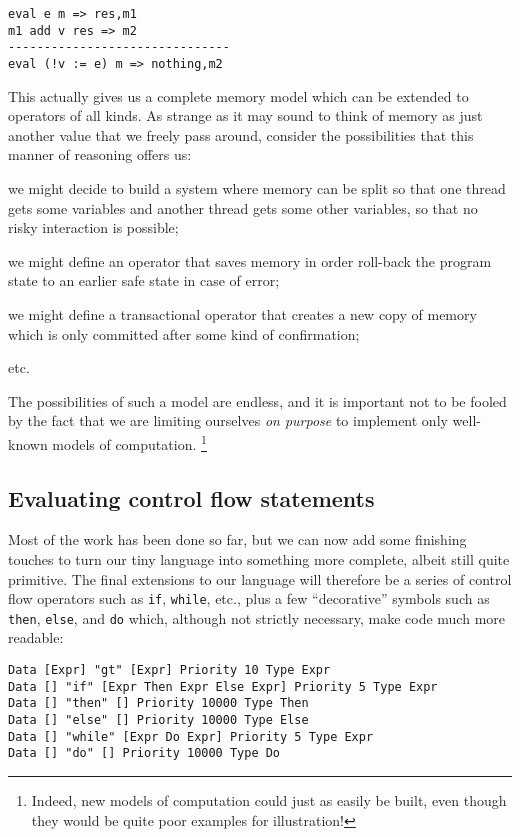 \begin{lstlisting}
eval e m => res,m1
m1 add v res => m2
-------------------------------
eval (!v := e) m => nothing,m2
\end{lstlisting}

This actually gives us a complete memory model which can be extended to operators of all kinds. As strange as it may sound to think of memory as just another value that we freely pass around, consider the possibilities that this manner of reasoning offers us:
\begin{inparaenum}
\item we might decide to build a system where memory can be split so that one thread gets some variables and another thread gets some other variables, so that no risky interaction is possible;
\item we might define an operator that saves memory in order roll-back the program state to an earlier safe state in case of error;
\item we might define a transactional operator that creates a new copy of memory which is only committed after some kind of confirmation;
\item etc.
\end{inparaenum}

The possibilities of such a model are endless, and it is important not to be fooled by the fact that we are limiting ourselves \textit{on purpose} to implement only well-known models of computation. \footnote{Indeed, new models of computation could just as easily be built, even though they would be quite poor examples for illustration!}

\subsection{Evaluating control flow statements}

Most of the work has been done so far, but we can now add some finishing touches to turn our tiny language into something more complete, albeit still quite primitive. The final extensions to our language will therefore be a series of control flow operators such as \texttt{if}, \texttt{while}, etc., plus a few ``decorative'' symbols such as \texttt{then}, \texttt{else}, and \texttt{do} which, although not strictly necessary, make code much more readable:

\begin{lstlisting}
Data [Expr] "gt" [Expr] Priority 10 Type Expr
Data [] "if" [Expr Then Expr Else Expr] Priority 5 Type Expr
Data [] "then" [] Priority 10000 Type Then
Data [] "else" [] Priority 10000 Type Else
Data [] "while" [Expr Do Expr] Priority 5 Type Expr
Data [] "do" [] Priority 10000 Type Do
\end{lstlisting}

